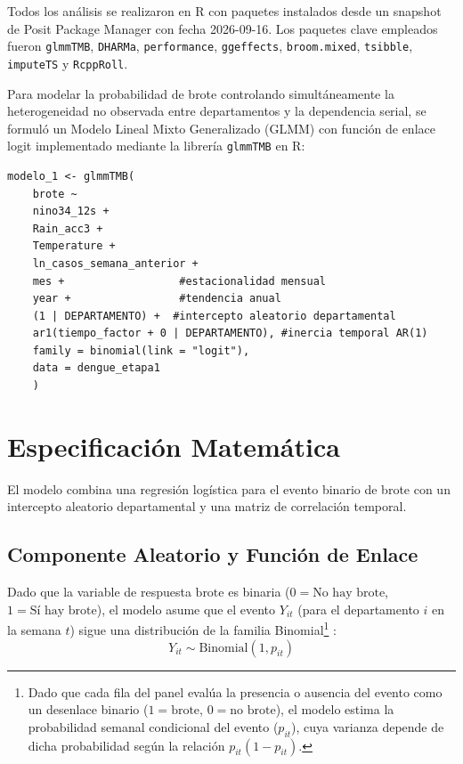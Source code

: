 \documentclass[11pt,a4paper]{article}
\begin{document}
\medskip

Todos los análisis se realizaron en R con paquetes instalados desde un snapshot de Posit Package Manager con fecha 2026-09-16. Los paquetes clave empleados fueron \texttt{glmmTMB}, \texttt{DHARMa}, \texttt{performance}, \texttt{ggeffects}, \texttt{broom.mixed}, \texttt{tsibble}, \texttt{imputeTS} y \texttt{RcppRoll}.

\medskip

Para modelar la probabilidad de brote controlando simultáneamente la heterogeneidad no observada entre departamentos y la dependencia serial, se formuló un Modelo Lineal Mixto Generalizado (GLMM) con función de enlace logit \parencite{breslow1993approximate, pinheiro2000mixed} implementado mediante la librería \texttt{glmmTMB}
\parencite{brooks2017glmmtmb} en R:

\medskip

\begin{lstlisting}[style=estiloR]
	modelo_1 <- glmmTMB(
	brote ~
	nino34_12s +
	Rain_acc3 +
	Temperature +
	ln_casos_semana_anterior +
	mes +                  #estacionalidad mensual
	year +                 #tendencia anual
	(1 | DEPARTAMENTO) +  #intercepto aleatorio departamental
	ar1(tiempo_factor + 0 | DEPARTAMENTO), #inercia temporal AR(1)
	family = binomial(link = "logit"),
	data = dengue_etapa1
	)
\end{lstlisting}


\section{Especificación Matemática}

El modelo combina una regresión logística para el evento binario de brote con un intercepto aleatorio departamental y una matriz de correlación temporal.

\subsection{Componente Aleatorio y Función de Enlace}
Dado que la variable de respuesta $\text{brote}$ es binaria ($0 = \text{No hay brote}$, $1 = \text{Sí hay brote}$), el modelo asume que el evento $Y_{it}$ (para el departamento $i$ en la semana $t$) sigue una distribución de la familia Binomial\footnote{Dado que cada fila del panel evalúa la presencia o ausencia del evento como un desenlace binario ($1 = \text{brote}$, $0 = \text{no brote}$), el modelo estima la probabilidad semanal condicional del evento ($p_{it}$), cuya varianza depende de dicha probabilidad según la relación $p_{it}(1 - p_{it})$.} \parencite{mccullagh1989generalized}:
\begin{equation}
	Y_{it} \sim \text{Binomial}(1, p_{it})
\end{equation}
\end{document}

